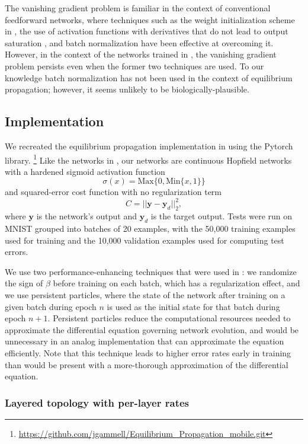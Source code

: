 \documentclass[utf8]{frontiersSCNS}
\newcommand{\mtx}[1]{\bm{#1}}
\begin{document}
The vanishing gradient problem is familiar in the context of conventional feedforward networks, where techniques such as the weight initialization scheme in \citep{glorot2010}, the use of activation functions with derivatives that do not lead to output saturation \citep{schmidhuber2015}, and batch normalization \citep{ioffe2015} have been effective at overcoming it. However, in the context of the networks trained in \citep{scellier17}, the vanishing gradient problem persists even when the former two techniques are used. To our knowledge batch normalization has not been used in the context of equilibrium propagation; however, it seems unlikely to be biologically-plausible.

\subsection{Implementation}
\label{sec:implementation}

We recreated the equilibrium propagation implementation in \citep{scellier17} using the Pytorch library.
\footnote{\url{https://github.com/jgammell/Equilibrium_Propagation_mobile.git}}
 Like the networks in \citep{scellier17}, our networks are continuous Hopfield networks with a hardened sigmoid activation function $$\sigma(x)=\text{Max}\{0, \text{Min}\{x, 1\}\}$$ and squared-error cost function with no regularization term $$C=||\mtx{y}-\mtx{y}_d||_2^2,$$ where $\mtx{y}$ is the network's output and $\mtx{y}_d$ is the target output. Tests were run on MNIST \citep{mnist1998} grouped into batches of 20 examples, with the 50,000 training examples used for training and the 10,000 validation examples used for computing test errors.

We use two performance-enhancing techniques that were used in \citep{scellier17}: we randomize the sign of $\beta$ before training on each batch, which has a regularization effect, and we use persistent particles, where the state of the network after training on a given batch during epoch $n$ is used as the initial state for that batch during epoch $n+1$. Persistent particles reduce the computational resources needed to approximate the differential equation governing network evolution, and would be unnecessary in an analog implementation that can approximate the equation efficiently. Note that this technique leads to higher error rates early in training than would be present with a more-thorough approximation of the differential equation.

\subsubsection{Layered topology with per-layer rates}
\label{sec:basic_topology}
\end{document}
